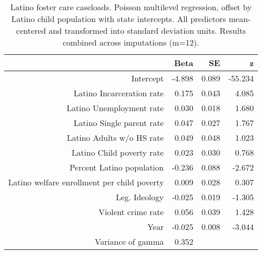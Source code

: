 \begin{table}[ht]
\centering
\caption{Latino foster care caseloads. Poisson multilevel regression, 
             offset by Latino child population with state intercepts. 
             All predictors mean-centered and transformed into standard deviation units.
             Results combined across imputations (m=12).} 
\label{l.c.tab}
\begin{tabular}{rrrr}
  \hline
 & Beta & SE & z \\ 
  \hline
Intercept & -4.898 & 0.089 & -55.234 \\ 
  Latino Incarceration rate & 0.175 & 0.043 & 4.085 \\ 
  Latino Unemployment rate & 0.030 & 0.018 & 1.680 \\ 
  Latino Single parent rate & 0.047 & 0.027 & 1.767 \\ 
  Latino Adults w/o HS rate & 0.049 & 0.048 & 1.023 \\ 
  Latino Child poverty rate & 0.023 & 0.030 & 0.768 \\ 
  Percent Latino population & -0.236 & 0.088 & -2.672 \\ 
  Latino welfare enrollment per child poverty & 0.009 & 0.028 & 0.307 \\ 
  Leg. Ideology & -0.025 & 0.019 & -1.305 \\ 
  Violent crime rate & 0.056 & 0.039 & 1.428 \\ 
  Year & -0.025 & 0.008 & -3.044 \\ 
  Variance of gamma & 0.352 &  &  \\ 
   \hline
\end{tabular}
\end{table}
